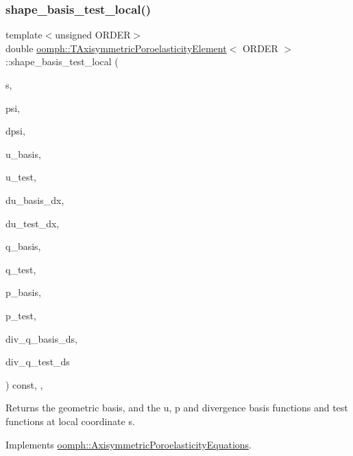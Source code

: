 \subsubsection{\texorpdfstring{shape\+\_\+basis\+\_\+test\+\_\+local()}{shape\_basis\_test\_local()}}
{\footnotesize\ttfamily template$<$unsigned O\+R\+D\+ER$>$ \\
double \hyperlink{classoomph_1_1TAxisymmetricPoroelasticityElement}{oomph\+::\+T\+Axisymmetric\+Poroelasticity\+Element}$<$ O\+R\+D\+ER $>$\+::shape\+\_\+basis\+\_\+test\+\_\+local (\begin{DoxyParamCaption}\item[{const \hyperlink{classoomph_1_1Vector}{Vector}$<$ double $>$ \&}]{s,  }\item[{\hyperlink{classoomph_1_1Shape}{Shape} \&}]{psi,  }\item[{\hyperlink{classoomph_1_1DShape}{D\+Shape} \&}]{dpsi,  }\item[{\hyperlink{classoomph_1_1Shape}{Shape} \&}]{u\+\_\+basis,  }\item[{\hyperlink{classoomph_1_1Shape}{Shape} \&}]{u\+\_\+test,  }\item[{\hyperlink{classoomph_1_1DShape}{D\+Shape} \&}]{du\+\_\+basis\+\_\+dx,  }\item[{\hyperlink{classoomph_1_1DShape}{D\+Shape} \&}]{du\+\_\+test\+\_\+dx,  }\item[{\hyperlink{classoomph_1_1Shape}{Shape} \&}]{q\+\_\+basis,  }\item[{\hyperlink{classoomph_1_1Shape}{Shape} \&}]{q\+\_\+test,  }\item[{\hyperlink{classoomph_1_1Shape}{Shape} \&}]{p\+\_\+basis,  }\item[{\hyperlink{classoomph_1_1Shape}{Shape} \&}]{p\+\_\+test,  }\item[{\hyperlink{classoomph_1_1Shape}{Shape} \&}]{div\+\_\+q\+\_\+basis\+\_\+ds,  }\item[{\hyperlink{classoomph_1_1Shape}{Shape} \&}]{div\+\_\+q\+\_\+test\+\_\+ds }\end{DoxyParamCaption}) const\hspace{0.3cm}{\ttfamily [inline]}, {\ttfamily [protected]}, {\ttfamily [virtual]}}



Returns the geometric basis, and the u, p and divergence basis functions and test functions at local coordinate s. 



Implements \hyperlink{classoomph_1_1AxisymmetricPoroelasticityEquations_a5514cde6de162cc6eb49fd9e5844500d}{oomph\+::\+Axisymmetric\+Poroelasticity\+Equations}.



